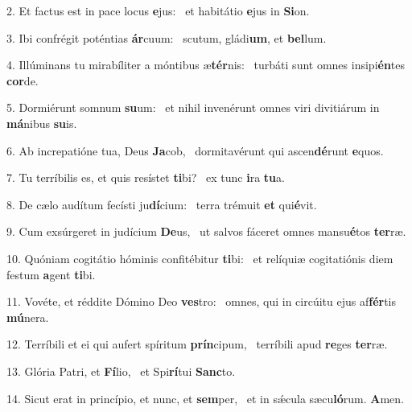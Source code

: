 2. Et factus est in pace locus \textbf{e}jus: \ast\  et habitátio \textbf{e}jus in \textbf{Si}on.\

3. Ibi confrégit poténtias \textbf{ár}cuum: \ast\  scutum, gládi\textbf{um}, et \textbf{bel}lum.\

4. Illúminans tu mirabíliter a móntibus æ\textbf{tér}nis: \ast\  turbáti sunt omnes insipi\textbf{én}tes \textbf{cor}de.\

5. Dormiérunt somnum \textbf{su}um: \ast\  et nihil invenérunt omnes viri divitiárum in \textbf{má}nibus \textbf{su}is.\

6. Ab increpatióne tua, Deus \textbf{Ja}cob, \ast\  dormitavérunt qui ascen\textbf{dé}runt \textbf{e}quos.\

7. Tu terríbilis es, et quis resístet \textbf{ti}bi? \ast\  ex tunc \textbf{i}ra \textbf{tu}a.\

8. De cælo audítum fecísti ju\textbf{dí}cium: \ast\  terra trémuit \textbf{et} qui\textbf{é}vit.\

9. Cum exsúrgeret in judícium \textbf{De}us, \ast\  ut salvos fáceret omnes mansu\textbf{é}tos \textbf{ter}ræ.\

10. Quóniam cogitátio hóminis confitébitur \textbf{ti}bi: \ast\  et relíquiæ cogitatiónis diem festum \textbf{a}gent \textbf{ti}bi.\

11. Vovéte, et réddite Dómino Deo \textbf{ves}tro: \ast\  omnes, qui in circúitu ejus af\textbf{fér}tis \textbf{mú}nera.\

12. Terríbili et ei qui aufert spíritum \textbf{prín}cipum, \ast\  terríbili apud \textbf{re}ges \textbf{ter}ræ.\

13. Glória Patri, et \textbf{Fí}lio, \ast\  et Spi\textbf{rí}tui \textbf{Sanc}to.\

14. Sicut erat in princípio, et nunc, et \textbf{sem}per, \ast\  et in sǽcula sæcu\textbf{ló}rum. \textbf{A}men.\

